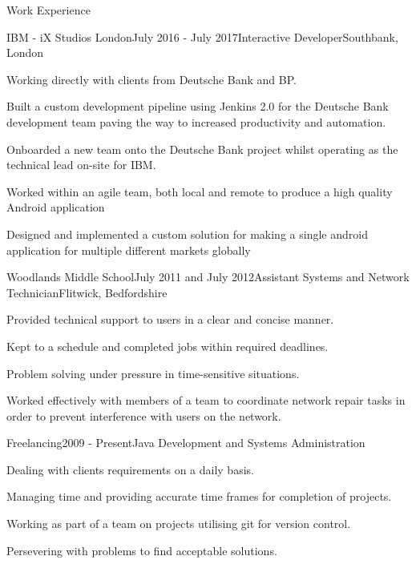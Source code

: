 \documentclass{resume} %
\begin{document}
\begin{rSection}{Work Experience}
	
\begin{rSubsection}{IBM - iX Studios London}{July 2016 - July 2017}{Interactive Developer}{Southbank, London}
	\item Working directly with clients from Deutsche Bank and BP.
	\item Built a custom development pipeline using Jenkins 2.0 for the Deutsche Bank development team paving the way to increased productivity and automation.
	\item Onboarded a new team onto the Deutsche Bank project whilst operating as the technical lead on-site for IBM.
	\item Worked within an agile team, both local and remote to produce a high quality Android application
	\item Designed and implemented a custom solution for making a single android application for multiple different markets globally
\end{rSubsection}


\begin{rSubsection}{Woodlands Middle School}{July 2011 and July 2012}{Assistant Systems and Network Technician}{Flitwick, Bedfordshire}
	\item Provided technical support to users in a clear and concise manner.
	\item Kept to a schedule and completed jobs within required deadlines.
	\item Problem solving under pressure in time-sensitive situations.
	\item Worked effectively with members of a team to coordinate network repair tasks in order to prevent interference with users on the network.
\end{rSubsection}


\begin{rSubsection}{Freelancing}{2009 - Present}{Java Development and Systems Administration}{}
\item Dealing with clients requirements on a daily basis.
\item Managing time and providing accurate time frames for completion of projects.
\item Working as part of a team on projects utilising git for version control.
\item Persevering with problems to find acceptable solutions.
\end{rSubsection}


\end{rSection}
\end{document}
